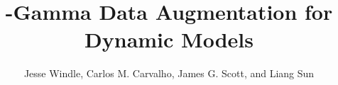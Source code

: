 \documentclass[12pt]{article}
\begin{document}
\renewcommand{\thefootnote}{\fnsymbol{footnote}}
\author{
  Jesse Windle\footnotemark[1],
  Carlos M. Carvalho\footnotemark[2],
  James G. Scott\footnotemark[2], and
  Liang Sun\footnotemark[2]%
}

\title{\Polya-Gamma Data Augmentation for Dynamic Models}

\maketitle

\renewcommand{\thefootnote}{\arabic{footnote}}




{}

\end{document}
